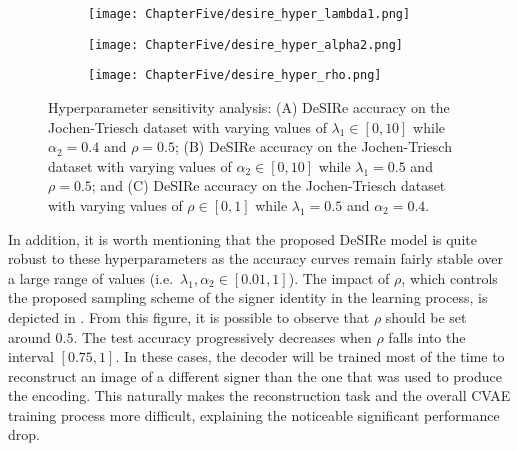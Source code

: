 \begin{figure*}
    \centering
    \begin{subfigure}{0.325\textwidth}
        \centering
        \texttt{[image: ChapterFive/desire\_hyper\_lambda1.png]}
        \caption{}
        \label{fig:desire_hyper_lambda1}
    \end{subfigure}
    \hfill
    \begin{subfigure}{0.325\textwidth}
        \centering
        \texttt{[image: ChapterFive/desire\_hyper\_alpha2.png]}
        \caption{}
        \label{fig:desire_hyper_alpha2}
    \end{subfigure}
    \hfill
    \begin{subfigure}{0.325\textwidth}
        \centering
        \texttt{[image: ChapterFive/desire\_hyper\_rho.png]}
        \caption{}
        \label{fig:desire_hyper_rho}
    \end{subfigure}
    \caption{Hyperparameter sensitivity analysis: (A) DeSIRe accuracy on the Jochen-Triesch dataset with varying values of $\lambda_{1}\in[0,10]$ while $\alpha_{2}=0.4$ and $\rho=0.5$; (B) DeSIRe accuracy on the Jochen-Triesch dataset with varying values of $\alpha_{2}\in[0,10]$ while $\lambda_{1}=0.5$ and $\rho=0.5$; and (C) DeSIRe accuracy on the Jochen-Triesch dataset with varying values of $\rho\in[0,1]$ while $\lambda_{1}=0.5$ and $\alpha_{2}=0.4$.}
    \label{fig:desire_hyperparams}
\end{figure*}

In addition, it is worth mentioning that the proposed DeSIRe model is quite robust to these hyperparameters as the accuracy curves remain fairly stable over a large range of values (i.e.\ $\lambda_{1},\alpha_{2}\in [0.01, 1]$). The impact of $\rho$, which controls the proposed sampling scheme of the signer identity in the learning process, is depicted in . From this figure, it is possible to observe that $\rho$ should be set around $0.5$. The test accuracy progressively decreases when $\rho$ falls into the interval $[0.75, 1]$. In these cases, the decoder will be trained most of the time to reconstruct an image of a different signer than the one that was used to produce the encoding. This naturally makes the reconstruction task and the overall CVAE training process more difficult, explaining the noticeable significant performance drop.
